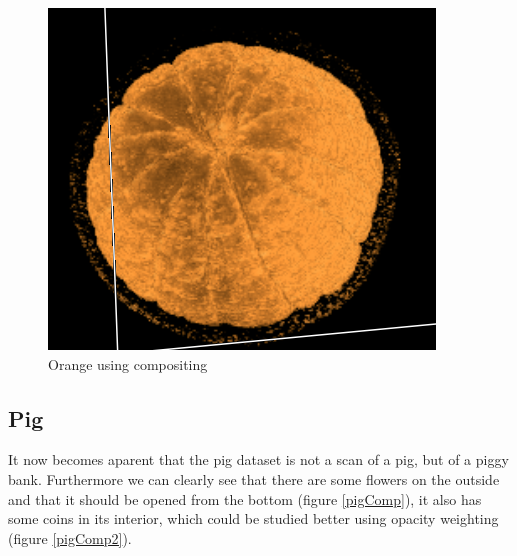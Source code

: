\documentclass[a4paper,twoside,11pt]{article}
\begin{document}
 \begin{figure}[h]
 \centering
 \includegraphics[scale=0.7]{images/orangeComp}
 \caption{Orange using compositing}
 \label{orangeComp}
  \end{figure} 
 
 \subsection{Pig}
 It now becomes aparent that the pig dataset is not a scan of a pig, but of a piggy bank. Furthermore we can clearly see that there are some flowers on the outside and that it should be opened from the bottom (figure \ref{pigComp}), it also has some coins in its interior, which could be studied better using opacity weighting (figure \ref{pigComp2}).
 
\end{document}

